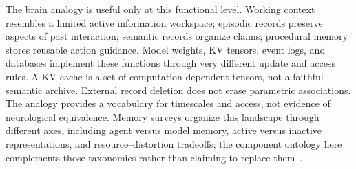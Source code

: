 The brain analogy is useful only at this functional level. Working context resembles a limited active information workspace; episodic records preserve aspects of past interaction; semantic records organize claims; procedural memory stores reusable action guidance. Model weights, KV tensors, event logs, and databases implement these functions through very different update and access rules. A KV cache is a set of computation-dependent tensors, not a faithful semantic archive. External record deletion does not erase parametric associations. The analogy provides a vocabulary for timescales and access, not evidence of neurological equivalence. Memory surveys organize this landscape through different axes, including agent versus model memory, active versus inactive representations, and resource--distortion tradeoffs; the component ontology here complements those taxonomies rather than claiming to replace them~\cite{corpus251213564,gou2026selective,colaco2026ratedistortion}.

